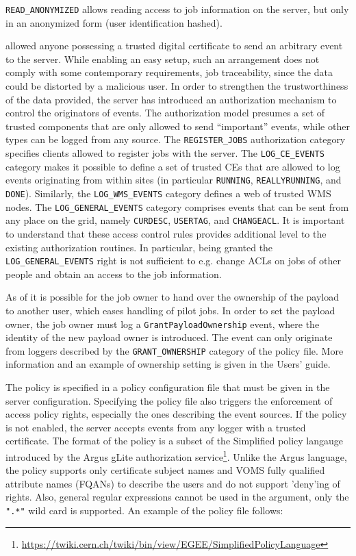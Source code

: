 \verb'READ_ANONYMIZED' allows reading access to job information on the server,
but only in an anonymized form (user identification hashed).

 allowed anyone possessing a trusted digital certificate to send an
arbitrary event to the \LB server. While enabling an easy setup, such an
arrangement does not comply with some contemporary requirements, \eg job
traceability, since the data could be distorted by a malicious user.  In order
to strengthen the trustworthiness of the data provided, the 
server has introduced an authorization mechanism to control the originators
of events.  The authorization model presumes a set of trusted components
that are only allowed to send ``important'' events, while other types can be
logged from any source. The \verb'REGISTER_JOBS' authorization category
specifies clients allowed to register jobs with the \LB server. The
\verb'LOG_CE_EVENTS' category makes it possible to define a set of trusted
CEs that are allowed to log events originating from within sites (in
particular \verb'RUNNING', \verb'REALLYRUNNING', and \verb'DONE').
Similarly, the \verb'LOG_WMS_EVENTS' category defines a web of trusted WMS
nodes. The \verb'LOG_GENERAL_EVENTS' category comprises events that can be
sent from any place on the grid, namely \verb'CURDESC', \verb'USERTAG', and
\verb'CHANGEACL'. It is important to understand that these access control
rules provides additional level to the existing authorization routines.
In particular, being granted the \verb'LOG_GENERAL_EVENTS' right is not sufficient to
e.g. change ACLs on jobs of other people and obtain an access to the job information.

As of  it is possible for the job owner to hand over the ownership
of the payload to another user, which eases handling \eg of pilot jobs. In
order to set the payload owner, the job owner must log a
\verb'GrantPayloadOwnership' event, where the identity of the new
payload owner is introduced. The event can only originate from loggers
described by the \verb'GRANT_OWNERSHIP' category of the policy file. More
information and an example of ownership setting is given in the \LB Users'
guide.

The \LB policy is specified in a policy configuration file that must be given
in the server configuration. Specifying the policy file also triggers the
enforcement of access policy rights, especially the ones describing the event
sources. If the policy is not enabled, the \LB server accepts events from any
logger with a trusted certificate. The format of the policy is a subset of the
Simplified policy langauge introduced by the Argus gLite authorization
service\footnote{\url{https://twiki.cern.ch/twiki/bin/view/EGEE/SimplifiedPolicyLanguage}}.
Unlike the Argus language, the \LB policy supports only certificate subject
names and VOMS fully qualified attribute names (FQANs) to describe the users
and do not support 'deny'ing of rights.  Also, general regular expressions
cannot be used in the argument, only the \verb'".*"' wild card is supported. An
example of the policy file follows:

